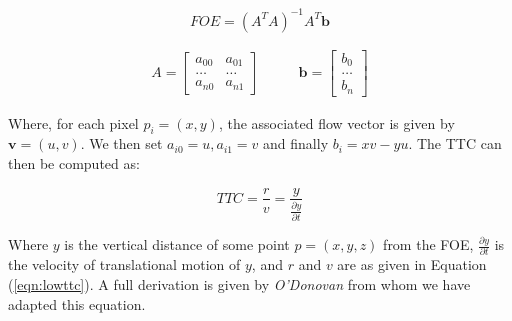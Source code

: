 \documentclass[a4paper,12pt,twoside,openright]{article}
\begin{document}


\begin{equation}
  FOE = (A^TA)^{-1}A^T\mathbf{b}
\end{equation}

\begin{equation*}
  \begin{split}
 A = 
\begin{bmatrix}
  a_{00} & a_{01}\\
  \dots  & \dots \\
  a_{n0} &  a_{n1}
\end{bmatrix}
\qquad
\end{split}
\begin{split}
\mathbf{b} =
\begin{bmatrix}
  b_0 \\
  \dots \\
  b_n
\end{bmatrix}
\end{split}
\end{equation*}
\newline

Where, for each pixel $p_i = (x, y)$, the associated flow vector is given by $\mathbf{v} = (u, v)$.
We then set $a_{i0} = u, a_{i1} = v$ and finally $b_i = xv - yu$. The TTC can then be computed as:

\begin{equation}
  TTC = \frac{r}{v} = \frac{y}{\frac{\partial y}{\partial t}}
\end{equation}

Where $y$ is the vertical distance of some point $p = (x,y,z)$ from the
FOE, $\frac{\partial y}{\partial t}$ is the velocity of translational motion of $y$, and
$r$ and $v$ are as given in Equation (\ref{eqn:lowttc}).
A full derivation is given by \textit{O'Donovan} from whom we have adapted this equation.
\newline
\end{document}
